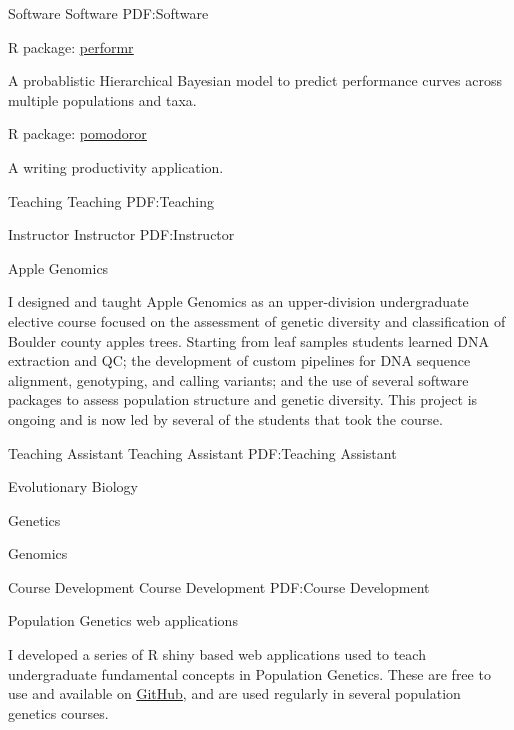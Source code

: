 \documentclass[letterpaper,MMMyyyy,nonstopmode]{simpleresumecv}
\begin{document}
\begin{Body}
{\Section
{Software}
{Software}
{PDF:Software}

\Gap
\BulletItem
R package: \href{https://github.com/silastittes/shiny_popgen}{\underline{performr}}
\hfill
\begin{Detail}
\Item A probablistic Hierarchical Bayesian model to predict performance curves across multiple populations and taxa. 
\end{Detail}

\Gap
\BulletItem
R package: \href{https://github.com/silastittes/pomodoror}{\underline{pomodoror}}
\hfill
\begin{Detail}
\Item A writing productivity application.  
\end{Detail}



\Section
{Teaching}
{Teaching}
{PDF:Teaching}


\SubSection
{Instructor}
{Instructor}
{PDF:Instructor}

\Gap
\BulletItem
Apple Genomics
\hfill
{}
\begin{Detail}
\Item I designed and taught Apple Genomics as an upper-division undergraduate elective course focused on the assessment of genetic diversity and classification of Boulder county apples trees. Starting from leaf samples students learned DNA extraction and QC; the development of custom pipelines for DNA sequence alignment, genotyping, and calling variants; and the use of several software packages to assess population structure and genetic diversity. This project is ongoing and is now led by several of the students that took the course.
\end{Detail}

\SubSection
{Teaching Assistant}
{Teaching Assistant}
{PDF:Teaching Assistant}

\Gap
\BulletItem
Evolutionary Biology
\hfill
{}

\Gap
\BulletItem
Genetics
\hfill
{}

\Gap
\BulletItem
Genomics
\hfill
{}


\SubSection
{Course Development}
{Course Development}
{PDF:Course Development}

\Gap
\BulletItem
Population Genetics web applications
\hfill
{}
\begin{Detail}
\Item I developed a series of R shiny based web applications used to teach undergraduate fundamental concepts in Population Genetics. These are free to use and available on \href{https://github.com/silastittes/shiny_popgen}{\underline{GitHub}}, and are used regularly in several population genetics courses.
\end{Detail}




}
\end{Body}
\end{document}
